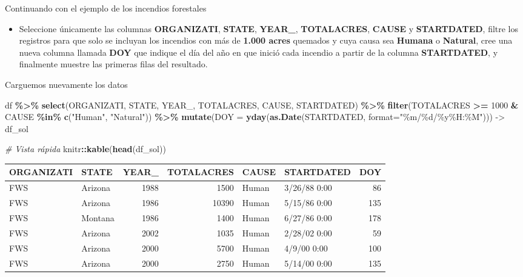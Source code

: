 \documentclass[
]{book}
\newenvironment{Shaded}{\begin{snugshade}}{\end{snugshade}}
\newcommand{\AttributeTok}[1]{\textcolor[rgb]{0.13,0.29,0.53}{#1}}
\newcommand{\CommentTok}[1]{\textcolor[rgb]{0.56,0.35,0.01}{\textit{#1}}}
\newcommand{\DecValTok}[1]{\textcolor[rgb]{0.00,0.00,0.81}{#1}}
\newcommand{\FunctionTok}[1]{\textcolor[rgb]{0.13,0.29,0.53}{\textbf{#1}}}
\newcommand{\NormalTok}[1]{#1}
\newcommand{\OtherTok}[1]{\textcolor[rgb]{0.56,0.35,0.01}{#1}}
\newcommand{\SpecialCharTok}[1]{\textcolor[rgb]{0.81,0.36,0.00}{\textbf{#1}}}
\newcommand{\StringTok}[1]{\textcolor[rgb]{0.31,0.60,0.02}{#1}}
\providecommand{\tightlist}{%
  \setlength{\itemsep}{0pt}\setlength{\parskip}{0pt}}
\begin{document}
Continuando con el ejemplo de los incendios forestales

\begin{itemize}
\tightlist
\item
  Seleccione únicamente las columnas \textbf{ORGANIZATI}, \textbf{STATE}, \textbf{YEAR\_}, \textbf{TOTALACRES}, \textbf{CAUSE} y \textbf{STARTDATED}, filtre los registros para que solo se incluyan los incendios con más de \textbf{1.000 acres} quemados y cuya causa sea \textbf{Humana} o \textbf{Natural}, cree una nueva columna llamada \textbf{DOY} que indique el día del año en que inició cada incendio a partir de la columna \textbf{STARTDATED}, y finalmente muestre las primeras filas del resultado.
\end{itemize}

Carguemos nuevamente los datos

\begin{Shaded}
\begin{Highlighting}[]
\NormalTok{df }\SpecialCharTok{\%\textgreater{}\%}
  \FunctionTok{select}\NormalTok{(ORGANIZATI, STATE, YEAR\_, TOTALACRES, CAUSE, STARTDATED) }\SpecialCharTok{\%\textgreater{}\%}
  \FunctionTok{filter}\NormalTok{(TOTALACRES }\SpecialCharTok{\textgreater{}=} \DecValTok{1000} \SpecialCharTok{\&}\NormalTok{ CAUSE }\SpecialCharTok{\%in\%} \FunctionTok{c}\NormalTok{(}\StringTok{"Human"}\NormalTok{, }\StringTok{"Natural"}\NormalTok{)) }\SpecialCharTok{\%\textgreater{}\%}
  \FunctionTok{mutate}\NormalTok{(}\AttributeTok{DOY =} \FunctionTok{yday}\NormalTok{(}\FunctionTok{as.Date}\NormalTok{(STARTDATED, }\AttributeTok{format=}\StringTok{"\%m/\%d/\%y\%H:\%M"}\NormalTok{))) }\OtherTok{{-}\textgreater{}}\NormalTok{ df\_sol}

\CommentTok{\# Vista rápida}
\NormalTok{knitr}\SpecialCharTok{::}\FunctionTok{kable}\NormalTok{(}\FunctionTok{head}\NormalTok{(df\_sol))}
\end{Highlighting}
\end{Shaded}

\begin{tabular}{l|l|r|r|l|l|r}
\hline
ORGANIZATI & STATE & YEAR\_ & TOTALACRES & CAUSE & STARTDATED & DOY\\
\hline
FWS & Arizona & 1988 & 1500 & Human & 3/26/88 0:00 & 86\\
\hline
FWS & Arizona & 1986 & 10390 & Human & 5/15/86 0:00 & 135\\
\hline
FWS & Montana & 1986 & 1400 & Human & 6/27/86 0:00 & 178\\
\hline
FWS & Arizona & 2002 & 1035 & Human & 2/28/02 0:00 & 59\\
\hline
FWS & Arizona & 2000 & 5700 & Human & 4/9/00 0:00 & 100\\
\hline
FWS & Arizona & 2000 & 2750 & Human & 5/14/00 0:00 & 135\\
\hline
\end{tabular}
\end{document}
